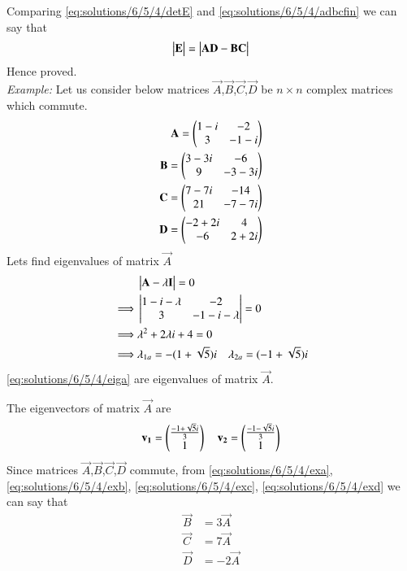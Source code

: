 Comparing \eqref{eq:solutions/6/5/4/detE} and \eqref{eq:solutions/6/5/4/adbcfin} we can say that
\begin{align}
    \begin{vmatrix}\mathbf{E}\end{vmatrix}=\begin{vmatrix}\mathbf{A}\mathbf{D}-\mathbf{B}\mathbf{C}\end{vmatrix}
\end{align}
Hence proved.
\\
{\em Example: }
Let us consider below matrices $\vec{A}$,$\vec{B}$,$\vec{C}$,$\vec{D}$ be $n\times n$ complex matrices which commute.
\begin{align}
    \mathbf{A}=\begin{pmatrix}1-i&-2\\3&-1-i\end{pmatrix}\label{eq:solutions/6/5/4/exa}\\
    \mathbf{B}=\begin{pmatrix}3-3i&-6\\9&-3-3i\end{pmatrix}\label{eq:solutions/6/5/4/exb}\\
    \mathbf{C}=\begin{pmatrix}7-7i&-14\\21&-7-7i\end{pmatrix}\label{eq:solutions/6/5/4/exc}\\
    \mathbf{D}=\begin{pmatrix}-2+2i&4\\-6&2+2i\end{pmatrix}\label{eq:solutions/6/5/4/exd}
\end{align}
Lets find eigenvalues of matrix $\vec{A}$
\begin{align}
    &\begin{vmatrix}\mathbf{A}-\lambda\mathbf{I}\end{vmatrix}=0\\
    \implies&\begin{vmatrix}1-i-\lambda&-2\\3&-1-i-\lambda\end{vmatrix}=0\\
    \implies&\lambda^2+2\lambda i+4=0\\
    \implies&\lambda_{1a}=-(1+\sqrt{5})i\quad\lambda_{2a}=(-1+\sqrt{5})i\label{eq:solutions/6/5/4/eiga}
\end{align}
\eqref{eq:solutions/6/5/4/eiga} are eigenvalues of matrix $\vec{A}$.

The eigenvectors of matrix $\vec{A}$ are
\begin{align}
    \mathbf{v_1}=\begin{pmatrix}\frac{-1+\sqrt{5}i}{3}\\1\end{pmatrix}\quad\mathbf{v_2}=\begin{pmatrix}\frac{-1-\sqrt{5}i}{3}\\1\end{pmatrix}
\end{align}
Since matrices $\vec{A}$,$\vec{B}$,$\vec{C}$,$\vec{D}$ commute, from \eqref{eq:solutions/6/5/4/exa}, \eqref{eq:solutions/6/5/4/exb}, \eqref{eq:solutions/6/5/4/exc}, \eqref{eq:solutions/6/5/4/exd} we can say that
\begin{align}
    \vec{B}&=3\vec{A}\\
    \vec{C}&=7\vec{A}\\
    \vec{D}&=-2\vec{A}
\end{align}

